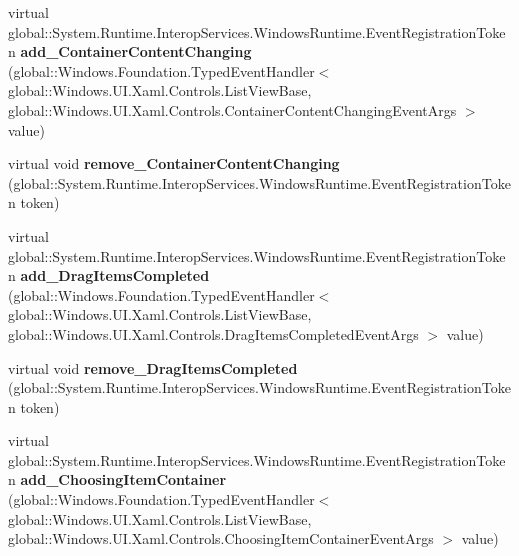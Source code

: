 \begin{DoxyCompactItemize}
virtual global\+::\+System.\+Runtime.\+Interop\+Services.\+Windows\+Runtime.\+Event\+Registration\+Token {\bfseries add\+\_\+\+Container\+Content\+Changing} (global\+::\+Windows.\+Foundation.\+Typed\+Event\+Handler$<$ global\+::\+Windows.\+U\+I.\+Xaml.\+Controls.\+List\+View\+Base, global\+::\+Windows.\+U\+I.\+Xaml.\+Controls.\+Container\+Content\+Changing\+Event\+Args $>$ value)
\item 
\mbox{\label{class_windows_1_1_u_i_1_1_xaml_1_1_controls_1_1_list_view_base_a1a4b1610e748210c7c253306be557396}} 
virtual void {\bfseries remove\+\_\+\+Container\+Content\+Changing} (global\+::\+System.\+Runtime.\+Interop\+Services.\+Windows\+Runtime.\+Event\+Registration\+Token token)
\item 
\mbox{\label{class_windows_1_1_u_i_1_1_xaml_1_1_controls_1_1_list_view_base_a4071ecc43776f01b4394b7e08cf5d353}} 
virtual global\+::\+System.\+Runtime.\+Interop\+Services.\+Windows\+Runtime.\+Event\+Registration\+Token {\bfseries add\+\_\+\+Drag\+Items\+Completed} (global\+::\+Windows.\+Foundation.\+Typed\+Event\+Handler$<$ global\+::\+Windows.\+U\+I.\+Xaml.\+Controls.\+List\+View\+Base, global\+::\+Windows.\+U\+I.\+Xaml.\+Controls.\+Drag\+Items\+Completed\+Event\+Args $>$ value)
\item 
\mbox{\label{class_windows_1_1_u_i_1_1_xaml_1_1_controls_1_1_list_view_base_afb4e5d552f4a20df8f6198bd74e0a5a0}} 
virtual void {\bfseries remove\+\_\+\+Drag\+Items\+Completed} (global\+::\+System.\+Runtime.\+Interop\+Services.\+Windows\+Runtime.\+Event\+Registration\+Token token)
\item 
\mbox{\label{class_windows_1_1_u_i_1_1_xaml_1_1_controls_1_1_list_view_base_a5f75e80fc48c067bdaeca77417953973}} 
virtual global\+::\+System.\+Runtime.\+Interop\+Services.\+Windows\+Runtime.\+Event\+Registration\+Token {\bfseries add\+\_\+\+Choosing\+Item\+Container} (global\+::\+Windows.\+Foundation.\+Typed\+Event\+Handler$<$ global\+::\+Windows.\+U\+I.\+Xaml.\+Controls.\+List\+View\+Base, global\+::\+Windows.\+U\+I.\+Xaml.\+Controls.\+Choosing\+Item\+Container\+Event\+Args $>$ value)
\item 
\mbox{\label{class_windows_1_1_u_i_1_1_xaml_1_1_controls_1_1_list_view_base_aa603855bd3d9391f02b8a6ae70908d43}} 

\end{DoxyCompactItemize}
